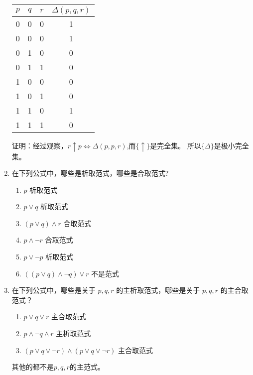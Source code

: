 \documentclass[UTF8]{ctexart}
\begin{document}
\begin{enumerate}
      \begin{table}[H]
         \centering
         \begin{tabular}{|cccc|}
            \hline
            $p$ & $q$ & $r$ & $\Delta(p,q,r)$ \\
            \hline
            0 & 0 & 0 & 1\\
            \hline
            0 & 0 & 0 & 1\\
            \hline
            0 &1& 0& 0\\
            \hline
            0 & 1 & 1 & 0\\ 
            \hline
            1 & 0 & 0 & 0\\
            \hline
            1 & 0 & 1 & 0\\
            \hline
            1 & 1 & 0 & 1\\
            \hline
            1 & 1 & 1 & 0\\
            \hline
         \end{tabular}
      \end{table}
      
      证明：经过观察，$r\uparrow p\Leftrightarrow \Delta(p,p,r)$,而$\{\uparrow \}$是完全集。
      所以$\{\Delta \}$是极小完全集。

      \item 在下列公式中，哪些是析取范式，哪些是合取范式?
      \begin{enumerate}
         \item $p$ 析取范式
         \item $p\vee q$ 析取范式
         \item $(p\vee q)\wedge r$ 合取范式
         \item $p\wedge \neg r$ 合取范式
         \item $p \vee \neg p$ 析取范式
         \item $(( p \vee q) \wedge \neg q) \vee r$ 不是范式
      \end{enumerate}
      
      \item 在下列公式中，哪些是关于 $p, q, r$ 的主析取范式，哪些是关于 $p, q, r$ 的主合取范式？
      \begin{enumerate}
         \item $p \vee q \vee r$ 主合取范式
         \item $p \wedge \neg q \wedge r$ 主析取范式
         \item $( p \vee q \vee \neg r ) \wedge ( p \vee q \vee \neg r)$ 主合取范式
      \end{enumerate}
      其他的都不是$p,q,r$的主范式。
      

\end{enumerate}
\end{document}
